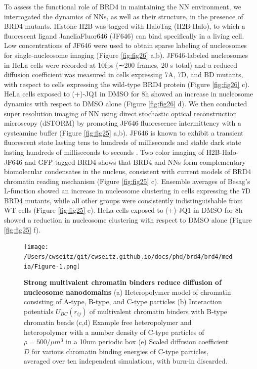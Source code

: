 To assess the functional role of BRD4 in maintaining the NN environment, we interrogated the dynamics of NNs, as well as their structure, in the presence of BRD4 mutants. Histone H2B was tagged with HaloTag \parencite{Los2008} (H2B-Halo), to which a fluorescent ligand JaneliaFluor646 (JF646) can bind speciﬁcally in a living cell. Low concentrations of JF646 were used to obtain sparse labeling of nucleosomes for single-nucleosome imaging (Figure \ref{fig:fig26} a,b). JF646-labeled nucleosomes in HeLa cells were recorded at 10fps (∼200 frames, 20 s total) and a reduced diffusion coefficient was measured in cells expressing 7A, 7D, and BD mutants, with respect to cells expressing the wild-type BRD4 protein (Figure \ref{fig:fig26} c). HeLa cells exposed to (+)-JQ1 in DMSO for 8h showed an increase in nucleosome dynamics with respect to DMSO alone (Figure \ref{fig:fig26} d). We then conducted super resolution imaging of NN using direct stochastic optical reconstruction microscopy (dSTORM) by promoting JF646 fluorescence intermittency with a cysteamine buffer (Figure \ref{fig:fig25} a,b). JF646 is known to exhibit a transient fluorescent state lasting tens to hundreds of milliseconds and stable dark state lasting hundreds of milliseconds to seconds \parencite{Grimm2015}. Two color imaging of H2B-Halo-JF646 and GFP-tagged BRD4 shows that BRD4 and NNs form complementary biomolecular condensates in the nucleus, consistent with current models of BRD4 chromatin reading mechanism (Figure \ref{fig:fig25} c). Ensemble averages of Besag’s L-function showed an increase in nucleosome clustering in cells expressing the 7D BRD4 mutants, while all other groups were consistently indistinguishable from WT cells (Figure \ref{fig:fig25} e). HeLa cells exposed to (+)-JQ1 in DMSO for 8h showed a reduction in nucleosome clustering with respect to DMSO alone (Figure \ref{fig:fig25} f).  

\begin{figure}[t]
\texttt{[image: /Users/cwseitz/git/cwseitz.github.io/docs/phd/brd4/brd4/media/Figure-1.png]}
\caption{\textbf{Strong multivalent chromatin binders reduce diffusion of nucleosome nanodomains} (a) Heteropolymer model of chromatin consisting of A-type, B-type, and C-type particles (b) Interaction potentials $U_{BC}(r_{ij})$ of multivalent chromatin binders with B-type chromatin beads (c,d) Example free heteropolymer and heteropolymer with a number density of C-type particles of $\rho=500/\mu m^3$ in a 10um periodic box (e) Scaled diffusion coefficient $D$ for various chromatin binding energies of C-type particles, averaged over ten independent simulations, with burn-in discarded.}
\label{fig:fig24}
\end{figure}

